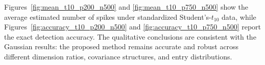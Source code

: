 \documentclass[12pt]{article}
\theoremstyle{plain}
\numberwithin{equation}{section}
\begin{document}
				Figures~\ref{fig:mean_t10_p200_n500} and \ref{fig:mean_t10_p750_n500} show the average estimated number of spikes under standardized Student's-$t_{10}$ data, while Figures~\ref{fig:accuracy_t10_p200_n500} and \ref{fig:accuracy_t10_p750_n500} report the exact detection accuracy. The qualitative conclusions are consistent with the Gaussian results: the proposed method remains accurate and robust across different dimension ratios, covariance structures, and entry distributions.
				
				
						
\end{document}
